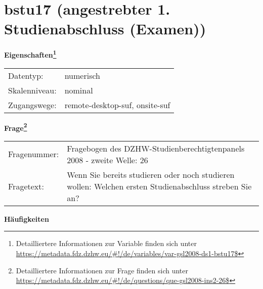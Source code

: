 
    \setcounter{footnote}{0}

    \vspace*{-1.8cm}
	\section{bstu17 (angestrebter 1. Studienabschluss (Examen))}
	\label{section:bstu17}



    \vspace*{0.5cm}
    \noindent\textbf{Eigenschaften\footnote{Detailliertere Informationen zur Variable finden sich unter
		\url{https://metadata.fdz.dzhw.eu/\#!/de/variables/var-gsl2008-ds1-bstu17$}}}\\
	\begin{tabularx}{\hsize}{@{}lX}
	Datentyp: & numerisch \\
	Skalenniveau: & nominal \\
	Zugangswege: &
	  remote-desktop-suf, 
	  onsite-suf
 \\
    \end{tabularx}



				\vspace*{0.5cm}
                \noindent\textbf{Frage\footnote{Detailliertere Informationen zur Frage finden sich unter
		              \url{https://metadata.fdz.dzhw.eu/\#!/de/questions/que-gsl2008-ins2-26$}}}\\
				\begin{tabularx}{\hsize}{@{}lX}
					Fragenummer: &
					  Fragebogen des DZHW-Studienberechtigtenpanels 2008 - zweite Welle:
					  26
 \\
					Fragetext: & Wenn Sie bereits studieren oder noch studieren wollen: Welchen ersten Studienabschluss streben Sie an? \\
				\end{tabularx}





        		\vspace*{0.5cm}
                \noindent\textbf{Häufigkeiten}

